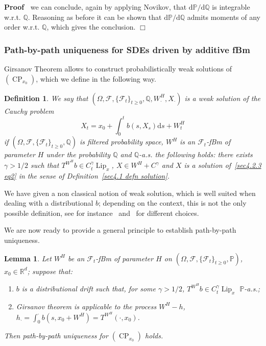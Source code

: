 \documentclass[10pt]{article}
\newcommand{\mathd}{\mathrm{d}}
\newcommand{\tmop}[1]{\ensuremath{\operatorname{#1}}}
\newenvironment{enumeratenumeric}{\begin{enumerate}[1.] }{\end{enumerate}}
\newenvironment{proof}{\noindent\textbf{Proof\ }}{\hspace*{\fill}$\Box$\medskip}
\newtheorem{definition}{Definition}
\newtheorem{lemma}{Lemma}
\begin{document}
\begin{proof}
  we can conclude, again by applying Novikov, that $\mathd \mathbb{P}/ \mathd
  \mathbb{Q}$ is integrable w.r.t. $\mathbb{Q}$. Reasoning as before it can be
  shown that $\mathd \mathbb{P}/ \mathd \mathbb{Q}$ admits moments of any
  order w.r.t. $\mathbb{Q}$, which gives the conclusion.
\end{proof}

\subsubsection{Path\mbox{-}by\mbox{-}path uniqueness for SDEs driven by
additive fBm}\label{sec4.2.3}

Girsanov Theorem allows to construct probabilistically weak solutions of
$(\tmop{CP}_{x_0})$, which we define in the following way.

\begin{definition}
  \label{sec4.2.3 defn weak solution} We say that $(\Omega, \mathcal{F}, \{
  \mathcal{F}_t \}_{t \geqslant 0}, \mathbb{Q}, W^H_{\cdot}, X_{\cdot})$ is a
  weak solution of the Cauchy problem
  \begin{equation}
    X_t = x_0 + \int_0^t b (s, X_s) \mathd s + W^H_t \label{sec4.2.3 eq2}
  \end{equation}
  if $(\Omega, \mathcal{F}, \{ \mathcal{F}_t \}_{t \geqslant 0}, \mathbb{Q})$
  is filtered probability space, $W^H$ is an $\mathcal{F}_t$\mbox{-}fBm of
  parameter $H$ under the probability $\mathbb{Q}$ and
  $\mathbb{Q}$\mbox{-}a.s. the following holds: there exists $\gamma > 1 / 2$
  such that $T^{W^H} b \in C^{\gamma}_t \tmop{Lip}_x$, $X \in W^H +
  C^{\gamma}$ and $X$ is a solution of~{\eqref{sec4.2.3 eq2}} in the sense of
  Definition~\ref{sec4.1 defn solution}.
\end{definition}

We have given a non classical notion of weak solution, which is well suited
when dealing with a distributional $b$; depending on the context, this is not
the only possible definition, see for instance~{\cite{athreya}}
and~{\cite{flandolirusso}} for different choices.

We are now ready to provide a general principle to establish
path\mbox{-}by\mbox{-}path uniqueness.

\begin{lemma}
  \label{sec4.2.3 criterion path-by-path uniqueness}Let $W^H$ be an
  $\mathcal{F}_t$-fBm of parameter $H$ on $(\Omega, \mathcal{F}, \{
  \mathcal{F}_t \}_{t \geqslant 0}, \mathbb{P})$, $x_0 \in \mathbb{R}^d$;
  suppose that:
  \begin{enumeratenumeric}
    \item $b$ is a distributional drift such that, for some $\gamma > 1 / 2$,
    $T^{W^H} b \in C^{\gamma}_t \tmop{Lip}_x$ $\mathbb{P}$\mbox{-}a.s.;
    
    \item Girsanov theorem is applicable to the process $W^H - h$, $h_{\cdot}
    = \int_0^{\cdot} b (s, x_0 + W^H) = T^{W^H} (\cdot, x_0)$.
  \end{enumeratenumeric}
  Then path\mbox{-}by\mbox{-}path uniqueness for $(\tmop{CP}_{x_0})$ holds.
\end{lemma}
\end{document}
